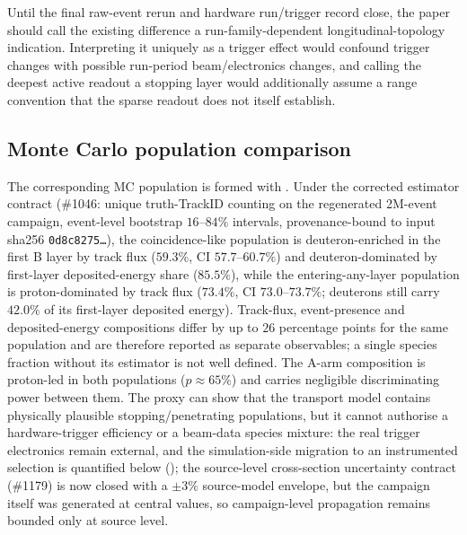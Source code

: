 
\begin{evidencebox}
Until the final raw-event rerun and hardware run/trigger record close, the paper should call the existing difference a run-family-dependent longitudinal-topology indication. Interpreting it uniquely as a trigger effect would confound trigger changes with possible run-period beam/electronics changes, and calling the deepest active readout a stopping layer would additionally assume a range convention that the sparse readout does not itself establish.
\end{evidencebox}

\subsection{Monte Carlo population comparison}

The corresponding MC population is formed with . Under the corrected estimator contract (\#1046: unique truth-TrackID counting on the regenerated 2M-event campaign, event-level bootstrap $16$--$84\%$ intervals, provenance-bound to input sha256 \texttt{0d8c8275\ldots}), the coincidence-like population is deuteron-enriched in the first B layer by track flux ($59.3\%$, CI $57.7$--$60.7\%$) and deuteron-dominated by first-layer deposited-energy share ($85.5\%$), while the entering-any-layer population is proton-dominated by track flux ($73.4\%$, CI $73.0$--$73.7\%$; deuterons still carry $42.0\%$ of its first-layer deposited energy). Track-flux, event-presence and deposited-energy compositions differ by up to $26$ percentage points for the same population and are therefore reported as separate observables; a single species fraction without its estimator is not well defined. The A-arm composition is proton-led in both populations ($p\approx65\%$) and carries negligible discriminating power between them. The proxy can show that the transport model contains physically plausible stopping/penetrating populations, but it cannot authorise a hardware-trigger efficiency or a beam-data species mixture: the real trigger electronics remain external, and the simulation-side migration to an instrumented selection is quantified below (); the source-level cross-section uncertainty contract (\#1179) is now closed with a $\pm3\%$ source-model envelope, but the campaign itself was generated at central values, so campaign-level propagation remains bounded only at source level.

